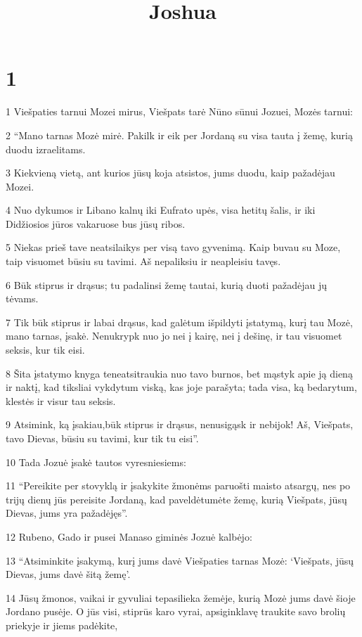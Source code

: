 

\title{Joshua}

\chapter{1}

\par 1 Viešpaties tarnui Mozei mirus, Viešpats tarė Nūno sūnui Jozuei, Mozės tarnui: 
\par 2 “Mano tarnas Mozė mirė. Pakilk ir eik per Jordaną su visa tauta į žemę, kurią duodu izraelitams. 
\par 3 Kiekvieną vietą, ant kurios jūsų koja atsistos, jums duodu, kaip pažadėjau Mozei. 
\par 4 Nuo dykumos ir Libano kalnų iki Eufrato upės, visa hetitų šalis, ir iki Didžiosios jūros vakaruose bus jūsų ribos. 
\par 5 Niekas prieš tave neatsilaikys per visą tavo gyvenimą. Kaip buvau su Moze, taip visuomet būsiu su tavimi. Aš nepaliksiu ir neapleisiu tavęs. 
\par 6 Būk stiprus ir drąsus; tu padalinsi žemę tautai, kurią duoti pažadėjau jų tėvams. 
\par 7 Tik būk stiprus ir labai drąsus, kad galėtum išpildyti įstatymą, kurį tau Mozė, mano tarnas, įsakė. Nenukrypk nuo jo nei į kairę, nei į dešinę, ir tau visuomet seksis, kur tik eisi. 
\par 8 Šita įstatymo knyga teneatsitraukia nuo tavo burnos, bet mąstyk apie ją dieną ir naktį, kad tiksliai vykdytum viską, kas joje parašyta; tada visa, ką bedarytum, klestės ir visur tau seksis. 
\par 9 Atsimink, ką įsakiau,­būk stiprus ir drąsus, nenusigąsk ir nebijok! Aš, Viešpats, tavo Dievas, būsiu su tavimi, kur tik tu eisi”. 
\par 10 Tada Jozuė įsakė tautos vyresniesiems: 
\par 11 “Pereikite per stovyklą ir įsakykite žmonėms paruošti maisto atsargų, nes po trijų dienų jūs pereisite Jordaną, kad paveldėtumėte žemę, kurią Viešpats, jūsų Dievas, jums yra pažadėjęs”. 
\par 12 Rubeno, Gado ir pusei Manaso giminės Jozuė kalbėjo: 
\par 13 “Atsiminkite įsakymą, kurį jums davė Viešpaties tarnas Mozė: ‘Viešpats, jūsų Dievas, jums davė šitą žemę’. 
\par 14 Jūsų žmonos, vaikai ir gyvuliai tepasilieka žemėje, kurią Mozė jums davė šioje Jordano pusėje. O jūs visi, stiprūs karo vyrai, apsiginklavę traukite savo brolių priekyje ir jiems padėkite, 
